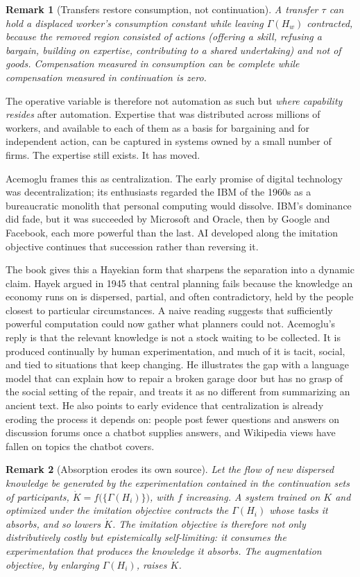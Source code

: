 \documentclass[11pt]{article}
\newtheorem{remark}{Remark}
\begin{document}
\begin{remark}[Transfers restore consumption, not continuation]
A transfer $\tau$ can hold a displaced worker's consumption constant while leaving $\Gamma(H_w)$ contracted, because the removed region consisted of actions (offering a skill, refusing a bargain, building on expertise, contributing to a shared undertaking) and not of goods. Compensation measured in consumption can be complete while compensation measured in continuation is zero.
\end{remark}

The operative variable is therefore not automation as such but \emph{where capability resides} after automation. Expertise that was distributed across millions of workers, and available to each of them as a basis for bargaining and for independent action, can be captured in systems owned by a small number of firms. The expertise still exists. It has moved.

Acemoglu frames this as centralization. The early promise of digital technology was decentralization; its enthusiasts regarded the IBM of the 1960s as a bureaucratic monolith that personal computing would dissolve. IBM's dominance did fade, but it was succeeded by Microsoft and Oracle, then by Google and Facebook, each more powerful than the last. AI developed along the imitation objective continues that succession rather than reversing it.

The book gives this a Hayekian form that sharpens the separation into a dynamic claim. Hayek argued in 1945 that central planning fails because the knowledge an economy runs on is dispersed, partial, and often contradictory, held by the people closest to particular circumstances. A naive reading suggests that sufficiently powerful computation could now gather what planners could not. Acemoglu's reply is that the relevant knowledge is not a stock waiting to be collected. It is produced continually by human experimentation, and much of it is tacit, social, and tied to situations that keep changing. He illustrates the gap with a language model that can explain how to repair a broken garage door but has no grasp of the social setting of the repair, and treats it as no different from summarizing an ancient text. He also points to early evidence that centralization is already eroding the process it depends on: people post fewer questions and answers on discussion forums once a chatbot supplies answers, and Wikipedia views have fallen on topics the chatbot covers.

\begin{remark}[Absorption erodes its own source]
Let the flow of new dispersed knowledge be generated by the experimentation contained in the continuation sets of participants, $\dot{K} = f\big(\{\Gamma(H_i)\}\big)$, with $f$ increasing. A system trained on $K$ and optimized under the imitation objective contracts the $\Gamma(H_i)$ whose tasks it absorbs, and so lowers $\dot{K}$. The imitation objective is therefore not only distributively costly but epistemically self-limiting: it consumes the experimentation that produces the knowledge it absorbs. The augmentation objective, by enlarging $\Gamma(H_i)$, raises $\dot{K}$.
\end{remark}
\end{document}
